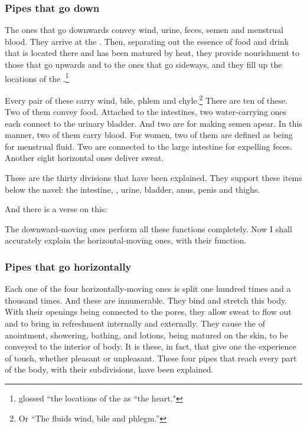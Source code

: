 \begin{refsection}
\begin{translation}
\subsubsection{Pipes that go down}

    \item [7]

    The ones that go downwards convey wind, urine, feces, semen and
    menstrual blood.  They arrive at the .
    Then, separating out the essence of food and drink that is located
    there and has been matured by heat, they provide nourishment to those that
    go upwards and to the ones that go sideways, and they fill up the locations of the
    .\footnote{ glossed ``the locations of the 
        as ``the heart."}

    Every pair of these carry wind, bile, phlem and chyle.\footnote{Or ``The fluids wind, bile and phlegm.''} There are ten of these.  Two of them convey food.  Attached to the intestines, two water-carrying ones each connect to the urinary bladder.  And two are for making semen apear. In this manner, two of them carry blood.  For women, two of them are defined as being for menstrual fluid. Two are connected to the large intestine for expelling feces. Another eight horizontal ones deliver sweat. 

    These are the thirty divisions that have been explained. They support these items below the navel: the intestine, , urine, bladder, anus, penis and thighs. 


\item[8]

And there is a verse on this:
\begin{sloka}
   The downward-moving ones perform all these functions completely.  Now I shall accurately explain the horizontal-moving ones, with their function. 
\end{sloka}

\subsubsection{Pipes that go horizontally}
\item [9]

Each one of the four horizontally-moving ones is split one hundred times
and a thousand times. And these are innumerable. They bind and stretch
this  body.  With their openings being
connected to the pores, they allow sweat to flow out and
 to bring in refreshment  internally and externally. They
cause the  of anointment, showering, bathing, and
lotions, being matured on the skin, to be conveyed to the interior of body.
It is these, in fact, that give one the experience of touch, whether pleasant or 
unpleasant.
These four pipes that reach every part of the body, with their subdivisions, have 
been explained. 



\end{translation}
\end{refsection}
